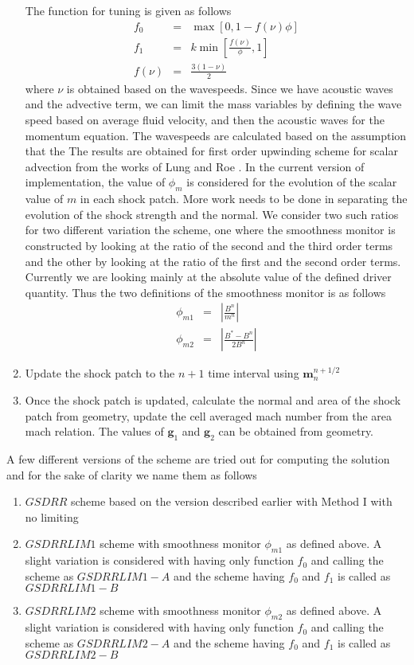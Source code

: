 \documentclass[a4paper,16pt]{article}
\begin{document}
\begin{enumerate}
The function for tuning is given as follows
	\begin{eqnarray}
	f_{0} &=& \max[0,1-f(\nu)\phi] \\
	f_1 &=& k \min [\frac{f(\nu)}{\phi},1] \\
	f(\nu) &=& \frac{3(1-\nu)}{2}
	\end{eqnarray}
	where $\nu$ is obtained based on the wavespeeds. Since we have acoustic waves and the advective term, we can limit the mass variables by defining the wave speed based on average fluid velocity, and then the acoustic waves for the momentum equation. The wavespeeds are calculated based on the assumption that the 
	The results are obtained for first order upwinding scheme for scalar advection from the works of  Lung and Roe \cite{lung2014toward,lungisotropic}.  In the current version of implementation, the value of $\phi_m$ is considered for the evolution of the scalar value of $m$ in each shock patch. More work needs to be done in separating the evolution of the shock strength and the normal. We consider two such ratios for two different variation the scheme, one where the smoothness monitor is constructed by looking at the ratio of the second and the third order terms and the other by looking at the ratio of the first and the second order terms. Currently we are looking mainly at the absolute value of the defined driver quantity.  Thus the two definitions of the smoothness monitor is as follows
	\begin{eqnarray}
	\phi_{m1} &=& |\frac{B^n}{m^n}| \\
	\phi_{m2} &=& |\frac{B^* - B^n}{2B^n}|
	\end{eqnarray}
	\item Update the shock patch to the $n+1$ time interval using $\textbf{m}_n^{n+1/2}$
	\item Once the shock patch is updated, calculate the normal and area of the shock patch from geometry, update the cell averaged mach number from the area mach relation. The values of $\textbf{g}_{1}$ and $\textbf{g}_{2}$ can be obtained from geometry.
\end{enumerate}
A few different versions of the scheme are tried out for computing the solution and for the sake of clarity we name them as follows
\begin{enumerate}
	\item $GSDRR$ scheme based on the version described earlier with Method I with no limiting
	\item $GSDRRLIM1$ scheme with smoothness monitor $\phi_{m1}$ as defined above. A slight variation is considered with having only function $f_0$ and calling the scheme as $GSDRRLIM1-A$ and the scheme having $f_0$ and $f_1$  is called as $GSDRRLIM1-B$
	\item $GSDRRLIM2$ scheme with  smoothness monitor $\phi_{m2}$ as defined above.   A slight variation is considered with having only function $f_0$ and calling the scheme as $GSDRRLIM2-A$ and the scheme having $f_0$ and $f_1$ is called as $GSDRRLIM2-B$
\end{enumerate}
\end{document}
